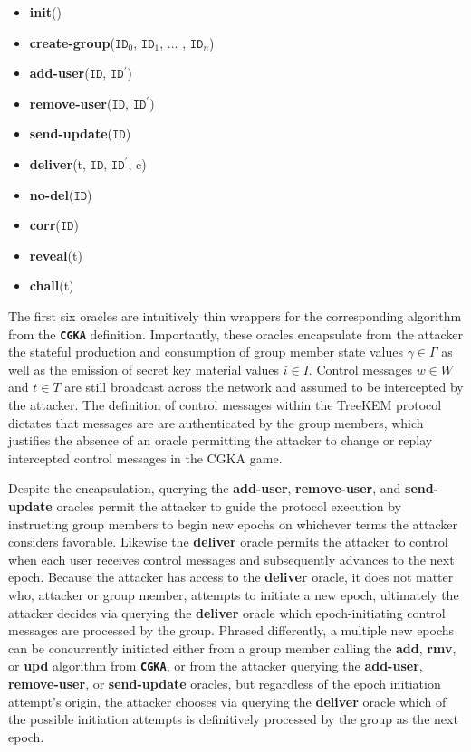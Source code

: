 \begin{itemize}
\item
  \textbf{init}()
\item
  \textbf{create-group}(\(\texttt{ID}_0\), \(\texttt{ID}_1\), \(\dots\) , \(\texttt{ID}_n\))
\item
  \textbf{add-user}(\(\texttt{ID}\), \(\texttt{ID}^{'}\))
\item
  \textbf{remove-user}(\(\texttt{ID}\), \(\texttt{ID}^{'}\))
\item
  \textbf{send-update}(\(\texttt{ID}\))
\item
  \textbf{deliver}(t, \(\texttt{ID}\), \(\texttt{ID}^{'}\), c)
\item
  \textbf{no-del}(\(\texttt{ID}\))
\item
  \textbf{corr}(\(\texttt{ID}\))
\item
  \textbf{reveal}(t)
\item
  \textbf{chall}(t)
\end{itemize}

The first six oracles are intuitively thin wrappers for the corresponding algorithm from the \textbf{\texttt{CGKA}} definition.
Importantly, these oracles encapsulate from the attacker the stateful production and consumption of group member state values \(\gamma \in \Gamma\) as well as the emission of secret key material values \(i \in I\).
Control messages \(w \in W\) and \(t \in T\) are still broadcast across the network and assumed to be intercepted by the attacker.
The definition of control messages within the TreeKEM protocol dictates that messages are are authenticated by the group members, which justifies the absence of an oracle permitting the attacker to change or replay intercepted control messages in the CGKA game.

Despite the encapsulation, querying the \textbf{add-user}, \textbf{remove-user}, and \textbf{send-update} oracles permit the attacker to guide the protocol execution by instructing group members to begin new epochs on whichever terms the attacker considers favorable.
Likewise the \textbf{deliver} oracle permits the attacker to control when each user receives control messages and subsequently advances to the next epoch.
Because the attacker has access to the \textbf{deliver} oracle, it does not matter who, attacker or group member, attempts to initiate a new epoch, ultimately the attacker decides via querying the \textbf{deliver} oracle which epoch-initiating control messages are processed by the group.
Phrased differently, a multiple new epochs can be concurrently initiated either from a group member calling the \textbf{add}, \textbf{rmv}, or \textbf{upd} algorithm from \textbf{\texttt{CGKA}}, or from the attacker querying the \textbf{add-user}, \textbf{remove-user}, or \textbf{send-update} oracles, but regardless of the epoch initiation attempt's origin, the attacker chooses via querying the \textbf{deliver} oracle which of the possible initiation attempts is definitively processed by the group as the next epoch.


